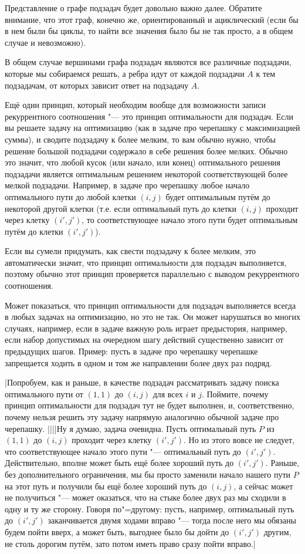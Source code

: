 Представление о графе подзадач будет довольно важно далее. Обратите внимание, что этот граф, конечно же,
ориентированный и ациклический (если бы в нем были бы циклы, то найти все значения было бы не так просто,
а в общем случае и невозможно).

В общем случае вершинами графа подзадач являются все различные подзадачи, которые мы собираемся решать, а
ребра идут от каждой подзадачи $A$ к тем подзадачам, от которых зависит ответ на подзадачу $A$.

Ещё один принцип, который необходим вообще для возможности записи рекуррентного соотношения 
"--- это принцип оптимальности для подзадач. Если вы решаете задачу на оптимизацию (как в задаче про черепашку
с максимизацией суммы), и сводите подзадачу к более мелким, то вам обычно нужно, чтобы решение большой подзадачи 
содержало в себе решения более мелких. Обычно это значит, что любой кусок (или начало, или конец) оптимального решения
подзадачи является оптимальным решением некоторой соответствующей более мелкой подзадачи. Например, в задаче про черепашку
любое начало оптимального пути до любой клетки $(i,j)$ будет оптимальным путём до некоторой другой клетки (т.е. если 
оптимальный путь до клетки $(i,j)$ проходит через клетку $(i',j')$, то соответствующее начало этого пути будет
оптимальным путём до клетки $(i',j')$). 

Если вы сумели придумать, как свести подзадачу к более мелким, это автоматически значит, что принцип оптимальности
для подзадач выполняется, поэтому обычно этот принцип проверяется параллельно с выводом рекуррентного соотношения.

Может показаться, что принцип оптимальности для подзадач выполняется всегда в любых задачах на оптимизацию, но это не так. Он может нарушаться во многих
случаях, например, если в задаче важную роль играет предыстория, например, если набор допустимых на очередном шагу
действий существенно зависит от предыдущих шагов. Пример: пусть в задаче про черепашку черепашке запрещается ходить
в одном и том же направлении более двух раз подряд.

\task|Попробуем, как и раньше, в качестве подзадач рассматривать задачу поиска оптимального пути от $(1,1)$ до $(i,j)$
для всех $i$ и $j$. Поймите, почему принцип оптимальности для подзадач тут не будет выполнен, и, соответственно, почему нельзя
решить эту задачу напрямую аналогично обычной задаче про черепашку.
||||Ну я думаю, задача очевидна. Пусть оптимальный путь $P$ из $(1,1)$ до $(i,j)$ проходит через клетку $(i',j')$. Но из этого вовсе не следует, что соответствующее начало этого пути "--- оптимальный путь до $(i',j')$. Действительно, вполне может быть ещё более хороший путь до $(i',j')$. Раньше, без дополнительного ограничения, мы бы просто заменили начало нашего пути $P$ на этот путь и получили бы ещё более хороший путь до $(i,j)$, а сейчас может не получиться "--- может оказаться, что на стыке более двух раз мы сходили в одну и ту же сторону. Говоря по"=другому: пусть, например, оптимальный путь до $(i',j')$ заканчивается двумя ходами вправо "--- тогда после него мы обязаны будем пойти вверх, а может быть, выгоднее было бы дойти до $(i',j')$ другим, не столь дорогим путём, зато потом иметь право сразу пойти вправо.|

